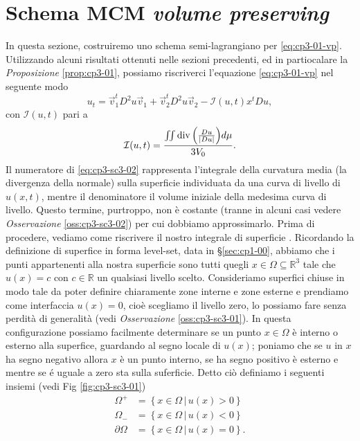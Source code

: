 \section{Schema MCM \emph{volume preserving}}
\label{sec:cp3-sc3-3}

In questa sezione, costruiremo uno schema semi-lagrangiano per
\eqref{eq:cp3-01-vp}. Utilizzando alcuni risultati ottenuti nelle
sezioni precedenti, ed in partiocalare la
\emph{Proposizione} \ref{prop:cp3-01}, possiamo riscriverci l'equazione \eqref{eq:cp3-01-vp} nel seguente modo
\begin{equation}
\label{eq:cp3-sc3-01}
u_t = \vec{v}_1^tD^2u\vec{v}_1 +\vec{v}_2^tD^2u\vec{v}_2-\mathcal{I}(u,t)x^tDu,
\end{equation}
con $\mathcal{I}(u,t)$ pari a
\begin{equation}
\label{eq:cp3-sc3-02}
\mathcal{I}(u,t) = \frac{\iint\operatorname{div}{\left(\frac{Du}{|Du|}\right)}d\mu}{3V_0}.
\end{equation}
Il numeratore di \eqref{eq:cp3-sc3-02} rappresenta l'integrale della
curvatura media (la divergenza della normale) sulla superficie
individuata da una curva di livello di $u(x,t)$, mentre il
denominatore il volume iniziale della medesima curva di livello. Questo
termine, purtroppo, non è costante (tranne in alcuni casi vedere
\emph{Osservazione} \ref{oss:cp3-sc3-02}) per cui dobbiamo
approssimarlo. Prima di procedere, vediamo come riscrivere il nostro integrale
di  superficie \cite[vedi][§1.5]{osher:fed}. Ricordando la definizione
di superfice in forma level-set, data in §\ref{sec:cp1-00}, abbiamo che i punti
appartenenti alla nostra superficie sono tutti quegli
$x\in\Omega\subseteq\mathbb{R}^3$ tale che $u(x)=c$ con
$c\in\mathbb{R}$ un qualsiasi livello scelto. Consideriamo superfici
chiuse in modo tale da poter definire chiaramente zone interne e zone
esterne e prendiamo come interfaccia $u(x)=0$, cioè scegliamo il
livello zero, lo possiamo fare senza perdità di generalità (vedi
\emph{Osservazione} \ref{oss:cp3-sc3-01}). In questa configurazione
possiamo facilmente  determinare se un punto $x\in\Omega$ è interno o
esterno alla superfice, guardando  al segno locale di $u(x)$;
poniamo che se $u$ in $x$ ha segno negativo allora $x$ è un punto
interno, se ha segno positivo è esterno e mentre se é uguale a zero
sta sulla suferficie. Detto ciò definiamo i seguenti insiemi (vedi Fig
\ref{fig:cp3-sc3-01})
\[
\begin{aligned}
\Omega^{+}&=\left\{x\in\Omega \,|\, u(x)>0\right\} \\
\Omega_{-}&=\left\{x\in\Omega \,|\, u(x)<0\right\} \\
 \partial\Omega&=\left\{x\in\Omega \,|\, u(x)=0\right\}.
\end{aligned}
\]  
